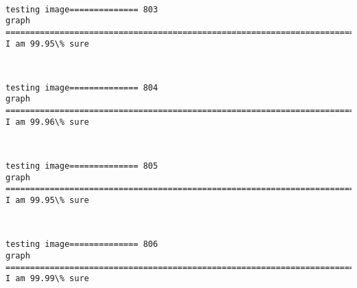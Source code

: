 \documentclass[11pt]{article}
\begin{document}
    \begin{center}
    \end{center}
    { \hspace*{\fill} \\}
    
    \begin{Verbatim}[commandchars=\\\{\}]
testing image============== 803
graph
============================================================================
I am 99.95\% sure

    \end{Verbatim}

    \begin{center}
    \end{center}
    { \hspace*{\fill} \\}
    
    \begin{Verbatim}[commandchars=\\\{\}]
testing image============== 804
graph
============================================================================
I am 99.96\% sure

    \end{Verbatim}

    \begin{center}
    \end{center}
    { \hspace*{\fill} \\}
    
    \begin{Verbatim}[commandchars=\\\{\}]
testing image============== 805
graph
============================================================================
I am 99.95\% sure

    \end{Verbatim}

    \begin{center}
    \end{center}
    { \hspace*{\fill} \\}
    
    \begin{Verbatim}[commandchars=\\\{\}]
testing image============== 806
graph
============================================================================
I am 99.99\% sure

    \end{Verbatim}
\end{document}
